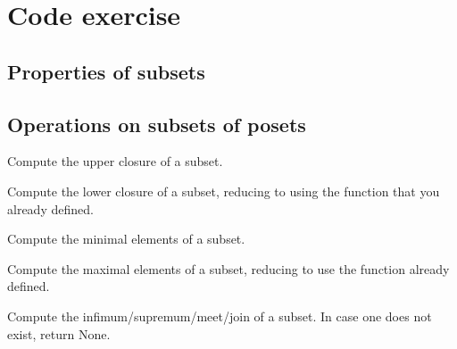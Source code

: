\section{Code exercise}

\subsection{Properties of subsets}

\subsection{Operations on subsets of posets}


\begin{codeexercise}
    Compute the upper closure of a subset.

\end{codeexercise}

\begin{codeexercise}
    Compute the lower closure of a subset, reducing to using the function  that you already defined.

\end{codeexercise}

\begin{codeexercise}
    Compute the minimal elements of a subset.


\end{codeexercise}

\begin{codeexercise}
    Compute the maximal elements of a subset, reducing to use the function  already defined.


\end{codeexercise}

\begin{codeexercise}
    Compute the infimum/supremum/meet/join of a subset.
    In case one does not exist, return None.


\end{codeexercise}

